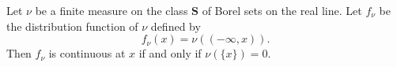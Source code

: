 Let $\nu$ be a finite measure on the class $\mathbf{S}$ of Borel sets on the real line. Let $f_\nu$ be the distribution function of $\nu$ defined by
$$f_\nu(x) = \nu((-\infty, x)).$$
Then $f_\nu$ is continuous at $x$ if and only if $\nu(\{x\}) = 0$.
